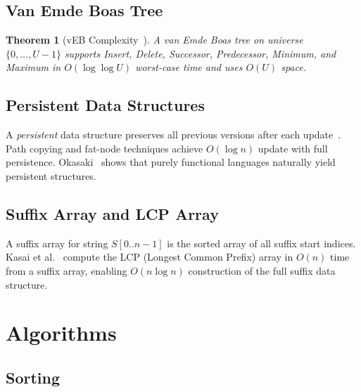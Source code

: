 \documentclass[12pt,a4paper]{article}
\newtheorem{theorem}{Theorem}[section]
\begin{document}
\subsection{Van Emde Boas Tree}

\begin{theorem}[vEB Complexity~\cite{vanembdeboas1977}]
A van Emde Boas tree on universe $\{0,\ldots,U-1\}$ supports
Insert, Delete, Successor, Predecessor, Minimum, and Maximum
in $O(\log\log U)$ worst-case time and uses $O(U)$ space.
\end{theorem}

\subsection{Persistent Data Structures}

A \emph{persistent} data structure preserves all previous versions after
each update~\cite{okasaki1998}.  Path copying and fat-node techniques achieve
$O(\log n)$ update with full persistence.  Okasaki~\cite{okasaki1998} shows
that purely functional languages naturally yield persistent structures.

\subsection{Suffix Array and LCP Array}

A suffix array for string $S[0..n-1]$ is the sorted array of all suffix
start indices.  Kasai et al.~\cite{kasai2001} compute the LCP (Longest
Common Prefix) array in $O(n)$ time from a suffix array, enabling
$O(n\log n)$ construction of the full suffix data structure.


\section{Algorithms}

\subsection{Sorting}
\end{document}
